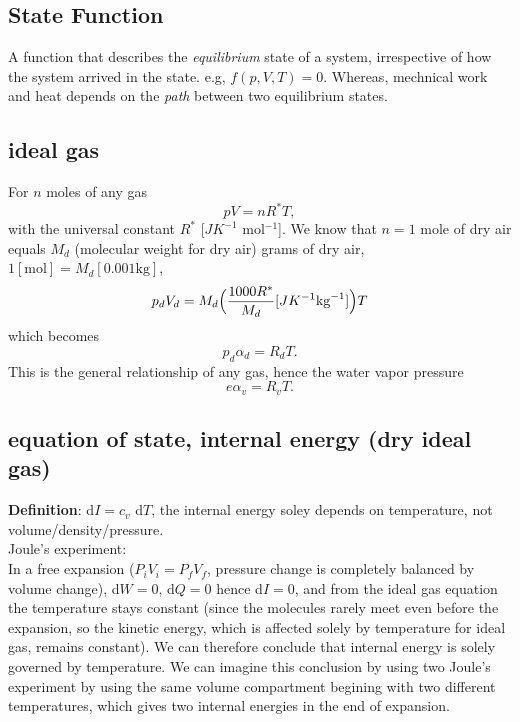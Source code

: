 \setlength\parindent{0pt}

\subsection{State Function}
A function that describes the \emph{equilibrium} state of a system, irrespective of how the system
arrived in the state. e.g, $f(p,V,T)=0$. Whereas, mechnical work and heat depends on the \emph{path}
between two equilibrium states. \\


\subsection{ideal gas}
For $n$ moles of any gas
\begin{equation}
    pV = nR^*T,
\end{equation}
with the universal constant $R^*$ [$J K^{-1}$ mol$^{-1}$]. We know that $n=1$ mole of dry air equals
$M_d$ (molecular weight for dry air) grams of dry air, $1[\text{mol}] = M_d [0.001\text{kg}]$,
\begin{equation}
        p_d V_d  = M_d \Big(\frac{1000 R^*}{M_d} [ J K^{-1} \text{kg}^{-1}]\Big) T \\
\end{equation}
which becomes
\begin{equation} \label{eq:idealgas2}
    p_d \alpha_d = R_d T.
\end{equation}
This is the general relationship of any gas, hence the water vapor pressure 
\begin{equation} \label{eq:idealgas3}
   e \alpha_v = R_v T.
\end{equation}

\subsection{equation of state, internal energy (dry ideal gas)}
{\bf{Definition}}: d$I = c_v$ d$T$, the internal energy soley depends on temperature, not
volume/density/pressure. \\

{Joule's experiment:} \\
In a free expansion ($P_iV_i = P_fV_f$, pressure change is completely balanced by volume change),
d$W = 0$, d$Q = 0$ hence d$I = 0$, and from the ideal gas equation the temperature stays constant
(since the molecules rarely meet even before the expansion, so the kinetic energy, which is affected
solely by temperature for ideal gas, remains constant). We can therefore conclude that internal
energy is solely governed by temperature. We can imagine this conclusion by using two Joule's
experiment by using the same volume compartment begining with two different temperatures, which
gives two internal energies in the end of expansion. 

